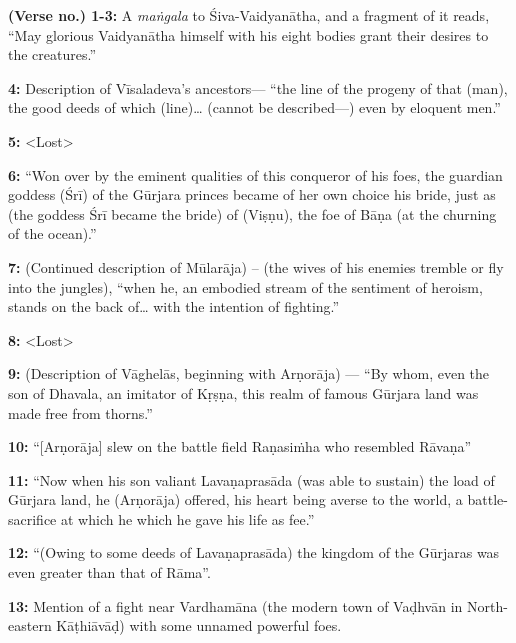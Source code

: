 \noindent
{\bf (Verse no.) 1-3:} A {\sl maṅgala} to Śiva-Vaidyanātha, and a fragment of it reads, “May glorious Vaidyanātha himself with his eight bodies grant their desires to the creatures.”

\noindent
{\bf 4:} Description of Vīsaladeva’s ancestors— “the line of the progeny of that (man), the good deeds of which (line)… (cannot be described—) even by eloquent men.”

\noindent
{\bf 5:} <Lost>

\smallskip
\noindent
{\bf 6:} “Won over by the eminent qualities of this conqueror of his foes, the guardian goddess (Śrī) of the Gūrjara princes became of her own choice his bride, just as (the goddess Śrī became the bride) of (Viṣṇu), the foe of Bāṇa (at the churning of the ocean).” 

\smallskip
\noindent
{\bf 7:} (Continued description of Mūlarāja) – (the wives of his enemies tremble or fly into the jungles), “when he, an embodied stream of the sentiment of heroism, stands on the back of… with the intention of fighting.”

\smallskip
\noindent
{\bf 8:} <Lost>

\smallskip
\noindent
{\bf 9:} (Description of Vāghelās, beginning with Arṇorāja) — “By whom, even the son of Dhavala, an imitator of Kṛṣṇa, this realm of famous Gūrjara land was made free from thorns.”

\smallskip
\noindent
{\bf 10:} “[Arṇorāja] slew on the battle field Raṇasiṁha who resembled Rāvaṇa”

\smallskip
\noindent
{\bf 11:} “Now when his son valiant Lavaṇaprasāda  (was able to sustain) the load of Gūrjara land, he (Arṇorāja) offered, his heart being averse to the world, a battle-sacrifice at which he which he gave his life as fee.”

\smallskip
\noindent
{\bf 12:} “(Owing to some deeds of Lavaṇaprasāda) the kingdom of the Gūrjaras was even greater than that of Rāma”. 

\smallskip
\noindent
{\bf 13:} Mention of a fight near Vardhamāna (the modern town of Vaḍhvān in North-eastern Kāṭhiāvāḍ) with some unnamed powerful foes.


